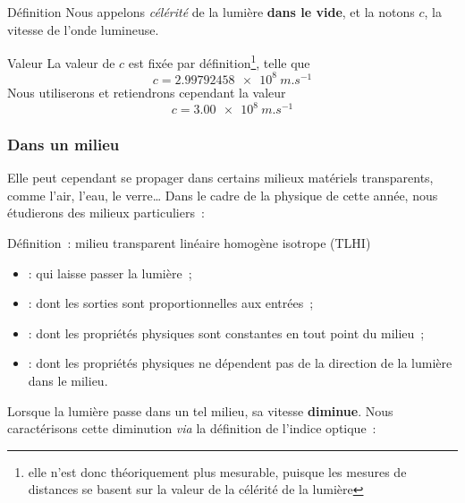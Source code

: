 \documentclass[../main/main.tex]{subfiles}
\begin{document}
\begin{tcbraster}[raster columns=5, raster equal height=rows]
    \begin{NCdefi}[raster multicolumn=2]{Définition}
        Nous appelons \textit{célérité} de la lumière \textbf{dans le vide}, et
        la notons $c$, la vitesse de l'onde lumineuse.
    \end{NCdefi}
    \begin{NCodgr}[raster multicolumn=3]{Valeur}
        La valeur de $c$ est fixée par définition\footnote{elle n'est donc
            théoriquement plus mesurable, puisque les mesures de distances se
        basent sur la valeur de la célérité de la lumière}, telle que
        \[c = \SI{2.99792458e8}{m.s^{-1}}\]
        Nous utiliserons et retiendrons cependant la valeur
        \[\boxed{c = \SI{3.00e8}{m.s^{-1}}}\]
    \end{NCodgr}
\end{tcbraster}

\subsubsection{Dans un milieu}

Elle peut cependant se propager dans certains milieux matériels transparents,
comme l'air, l'eau, le verre… Dans le cadre de la physique de cette année, nous
étudierons des milieux particuliers~:

\vfill

\begin{NCdefi}{Définition~: milieu transparent linéaire homogène isotrope (TLHI)}
    \begin{itemize}[leftmargin=66pt]
        \item[\textbf{Transparent}] : qui laisse passer la lumière~;
        \item[\textbf{Linéaire}] : dont les sorties sont proportionnelles aux
            entrées~;
        \item[\textbf{Homogène}] : dont les propriétés physiques sont
            constantes en tout point du milieu~;
        \item[\textbf{Isotrope}] : dont les propriétés physiques ne
            dépendent pas de la direction de la lumière dans le milieu.
    \end{itemize}
\end{NCdefi}

Lorsque la lumière passe dans un tel milieu, sa vitesse \textbf{diminue}. Nous
caractérisons cette diminution \textit{via} la définition de l'indice optique~:
\end{document}
